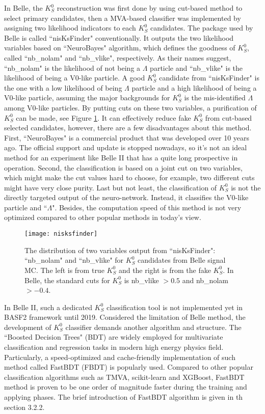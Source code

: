  In Belle, the $K_S^0$ reconstruction was first done by using cut-based method to select primary candidates, then a MVA-based classifier was implemented by assigning two likelihood indicators to each $K_S^0$ candidates. The package used by Belle is called ``nisKsFinder"\cite{b2book} conventionally. It outputs the two likelihood variables based on ``NeuroBayes" algorithm\cite{feindt2006neurobayes}, which defines the goodness of $K_S^0$, called ``nb\_nolam" and ``nb\_vlike", respectively. As their names suggest, ``nb\_nolam" is the likelihood of not being a $\Lambda$ particle and ``nb\_vlike" is the likelihood of being a V0-like particle. A good $K_S^0$ candidate from ``nisKsFinder" is the one with a low likelihood of being $\Lambda$ particle and a high likelihood of being a V0-like particle, assuming the major backgrounds for $K_S^0$ is the mis-identified $\Lambda$ among V0-like particles. By putting cuts on these two variables, a purification of $K_S^0$ can be made, see Figure \ref{b1niskf}. It can effectively reduce fake $K_S^0$ from cut-based selected candidates, however, there are a few disadvantages about this method. First, ``NeuroBayes" is a commercial product that was developed over 10 years ago. The official support and update is stopped nowadays, so it's not an ideal method for an experiment like Belle II that has a quite long prospective in operation. Second, the classification is based on a joint cut on two variables, which might make the cut values hard to choose, for example, two different cuts might have very close purity. Last but not least, the classification of $K_S^0$ is not the directly targeted output of the neuro-network. Instead, it classifies the V0-like particle and ``$\Lambda$". Besides, the computation speed of this method is not very optimized compared to other popular methods in today's view. 

\begin{figure}[htpb]
	\centering 
	\texttt{[image: nisksfinder]}
	\caption{The distribution of two variables output from ``nisKsFinder": ``nb\_nolam" and ``nb\_vlike" for $K_S^0$ candidates from Belle signal MC. The left is from true $K_S^0$ and the right is from the fake $K_S^0$. In Belle, the standard cuts for $K_S^0$ is nb\_vlike $> 0.5$ and nb\_nolam $> -0.4$\cite{kang2020measurement}.}
	\label{b1niskf}
\end{figure}


In Belle II, such a dedicated $K_S^0$ classification tool is not implemented yet in BASF2 framework until 2019. Considered the limitation of Belle method, the development of $K_S^0$ classifier demands another algorithm and structure. The ``Boosted Decision Trees" (BDT) are widely employed for multivariate classification and regression tasks in modern high energy physics field. Particularly, a speed-optimized and cache-friendly
implementation of such method called FastBDT (FBDT) is popularly used\cite{keck2016fastbdt}. Compared to other popular classification algorithms such as TMVA, scikit-learn and XGBoost, FastBDT method is proven to be one order of magnitude faster during the training and applying phases\cite{keck2016fastbdt}. The brief introduction of FastBDT algorithm is given in th section 3.2.2. 

